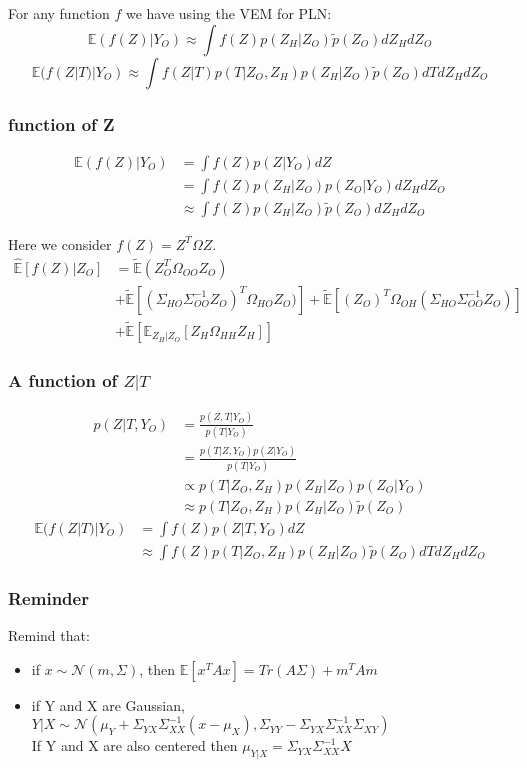 \documentclass[11pt,a4paper]{article}
\newcommand{\Esp}{\mathds{E}}
\begin{document}
For any function $f$ we have using the VEM for PLN:
$$\Esp(f(Z)|Y_O)  \approx \int f(Z) p(Z_H|Z_O)\tilde{p}(Z_O) dZ_H dZ_O$$
$$\Esp(f(Z|T)|Y_O)  \approx \int f(Z|T) p(T|Z_O,Z_H) p(Z_H|Z_O)\tilde{p}(Z_O) dT dZ_H dZ_O$$
\subsubsection{ function of Z}
\begin{align*}
\Esp(f(Z)|Y_O) &=\int f(Z) p(Z|Y_O) dZ\\
&=\int f(Z) p(Z_H|Z_O) p(Z_O|Y_O) dZ_H dZ_O\\
&\approx \int f(Z) p(Z_H|Z_O)\tilde{p}(Z_O) dZ_H dZ_O
\end{align*}


 Here we consider $f(Z) = Z^T\Omega Z$.
\begin{align*}
\widehat{\Esp}[f(Z)|Z_O] &= \tilde{\Esp}(Z_O^T\Omega_{OO}Z_O)\\
& +\tilde{\Esp}\left[(\Sigma_{HO}\Sigma_{OO}^{-1} Z_O)^T \Omega_{HO}Z_O)\right] +\tilde{\Esp}\left[(Z_O)^T \Omega_{OH} (\Sigma_{HO}\Sigma_{OO}^{-1} Z_O)\right]\\
&+ \tilde{\Esp}\left[\Esp_{Z_H|Z_O} [Z_H\Omega_{HH}Z_H]\right]
\end{align*}


\subsubsection{A function of $Z|T$}
\begin{align*}
 p(Z|T,Y_O) &= \frac{p(Z,T|Y_O)}{p(T|Y_O)}\\
 &= \frac{p(T|Z,Y_O) p(Z|Y_O)}{p(T|Y_O)}\\
 & \propto p(T|Z_O,Z_H) p(Z_H|Z_O) p(Z_O|Y_O)\\
 &\approx  p(T|Z_O,Z_H) p(Z_H|Z_O)  \tilde{p}(Z_O) 
\end{align*}
\begin{align*}
\Esp(f(Z|T)|Y_O) &=\int f(Z) p(Z|T,Y_O) dZ\\
&\approx \int f(Z) p(T|Z_O,Z_H)p(Z_H|Z_O)\tilde{p}(Z_O) dT dZ_H dZ_O
\end{align*}


\subsubsection{Reminder}
Remind that:
\begin{itemize}
\item if $x\sim\mathcal{N}(m, \Sigma)$, then
$\Esp[x^TAx] = Tr(A\Sigma) + m^TAm$
\item if Y and X are Gaussian, $Y|X \sim \mathcal{N}(\mu_Y+\Sigma_{YX}\Sigma_{XX}^{-1}(x-\mu_X) , \Sigma_{YY} - \Sigma_{YX}\Sigma_{XX}^{-1}\Sigma_{XY})$\\
If Y and X are also centered then $\mu_{Y|X} = \Sigma_{YX}\Sigma_{XX}^{-1} X$
\end{itemize}
\end{document}
